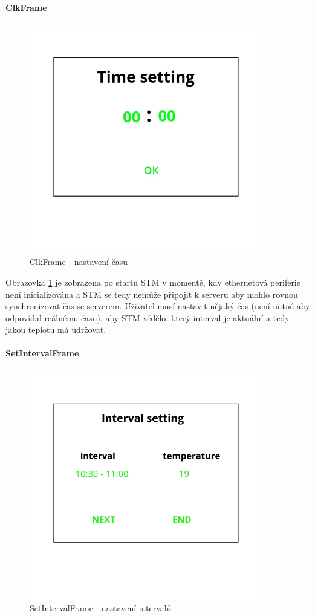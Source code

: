 \paragraph{ClkFrame}
\begin{figure}[H]\centering
\includegraphics[width=100mm, height=100mm]{../img/clk_frame.jpg}
\caption{ClkFrame - nastavení času}
\label{clk-frame}
\end{figure}

Obrazovka \ref{clk-frame} je zobrazena po startu STM v momentě, kdy ethernetová periferie není inicializována a
STM se tedy nemůže připojit k serveru aby mohlo rovnou synchronizovat čas se serverem.
Uživatel musí nastavit nějaký čas (není nutné aby odpovídal reálnému času), aby STM vědělo, který
interval je aktuální a tedy jakou teplotu má udržovat.

\paragraph{SetIntervalFrame}
\begin{figure}[H]\centering
\includegraphics[width=100mm, height=100mm]{../img/interval_setting_frame.jpg}
\caption{SetIntervalFrame - nastavení intervalů}
\label{set-interval-frame}
\end{figure}

